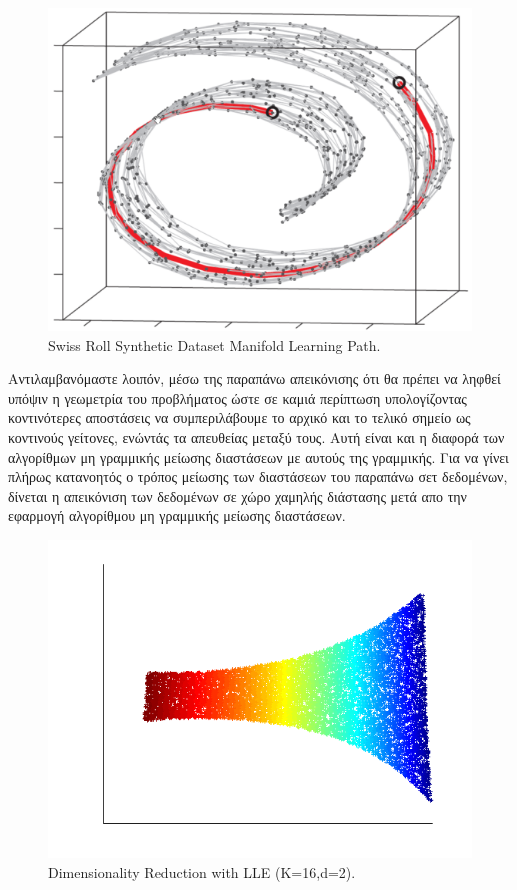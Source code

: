 \par
\begin{figure}[h!]
\centering
\includegraphics[scale=0.5]{figs/3.png}
\newline
\caption{\textlatin{Swiss Roll Synthetic Dataset Manifold Learning Path.}} 
\end{figure}
\par
\vspace*{2cm}
Αντιλαμβανόμαστε λοιπόν, μέσω της παραπάνω απεικόνισης ότι θα πρέπει να ληφθεί υπόψιν η γεωμετρία του προβλήματος ώστε σε καμιά περίπτωση υπολογίζοντας κοντινότερες αποστάσεις να συμπεριλάβουμε το αρχικό και το τελικό σημείο ως κοντινούς γείτονες, ενώντάς τα απευθείας μεταξύ τους. Αυτή είναι και η διαφορά των αλγορίθμων μη γραμμικής μείωσης διαστάσεων με αυτούς της γραμμικής. Για να γίνει πλήρως κατανοητός ο τρόπος μείωσης των διαστάσεων του παραπάνω σετ δεδομένων, δίνεται η απεικόνιση των δεδομένων σε χώρο χαμηλής διάστασης μετά απο την εφαρμογή αλγορίθμου μη γραμμικής μείωσης διαστάσεων.
\clearpage
\begin{figure}[t]
\centering
\includegraphics[scale=0.8]{figs/4.png}
\newline
\caption{\textlatin{Dimensionality Reduction with LLE (K=16,d=2).}} 
\end{figure}
